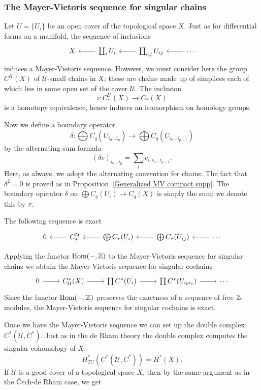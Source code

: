 \subsubsection{The Mayer-Vietoris sequence for singular chains}
Let $U=\{U_i\}$ be an open cover of the topological space $X$. Just as for differential forms on a manifold, the sequence of inclusions
\[\begin{tikzcd}
X&\coprod_iU_i\ar[l]&\coprod_{i,j}U_{ij}\ar[l]&\cdots\ar[l]
\end{tikzcd}\]
induces a Mayer-Vietoris sequence. However, we must consider here the group $C^{\mathcal{U}}(X)$ of $\mathcal{U}$-small chains in $X$; these are chains made up of 
simplices each of which lies in some open set of the cover $\mathcal{U}$. The inclusion
\[i:C^{\mathcal{U}}_*(X)\to C_*(X)\]
is a homotopy equivalence, hence induces an isomorphism on homology groups.\par
Now we define a boundary operator
\[\delta:\bigoplus C_q(U_{i_0\dots i_p})\to \bigoplus C_q(U_{i_0\dots i_{p-1}})\]
by the alternating sum formula
\[(\delta c)_{i_0\dots i_p}=\sum_ic_{i,i_0\dots i_{p-1}}.\]
Here, as always, we adopt the alternating convention for chains. The fact that $\delta^2=0$ is proved as in Proposition~\ref{Generalized MV compact supp}. The boundary 
operator $\delta$ on $\bigoplus C_q(U_i)\to C_q(X)$ is simply the sum; we denote this by $\varepsilon$.
\begin{proposition}
The following sequence is exact
\[\begin{tikzcd}
0&C_*^{\mathcal{U}}\ar[l]&\bigoplus C_*(U_i)\ar[l]&\bigoplus C_*(U_{ij})\ar[l]&\cdots\ar[l]
\end{tikzcd}\]
\end{proposition}
Applying the functor $\mathrm{Hom}(-,\mathbb{Z})$ to the Mayer-Vietoris sequence for singular chains we obtain the Mayer-Vietoris sequence for singular cochains
\[\begin{tikzcd}
0\ar[r]&C^*_{\mathcal{U}}(X)\ar[r]&\prod C^*(U_i)\ar[r]&\prod C^*(U_{i_0 i_1})\ar[r]&\cdots
\end{tikzcd}\]
Since the functor $\mathrm{Hom}(-,\mathbb{Z})$ preserves the exactness of a sequence of free $\mathbb{Z}$-modules, the Mayer-Vietoris sequence for singular cochains is exact.\par
Once we have the Mayer-Vietoris sequence we can set up the double complex $C^*(\mathcal{U},C^*)$. Just as in the de Rham theory the double complex computes the singular 
cohomology of $X$:
\[H^*_{TC}(C^*(\mathcal{U},C^*))=H^*(X).\]
If $\mathcal{U}$ is a good cover of a topological space $X$, then by the same argument as in the \v{C}ech-de Rham case, we get
